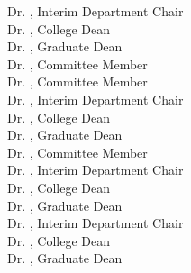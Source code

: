 \begin{titlepage}
Dr. \depchair, Interim Department Chair\\
Dr. \colldean, College Dean\\
Dr. \graddean, Graduate Dean\\
\else
\ifdefined\commemb
Dr. \commema, Committee Member\\
Dr. \commemb, Committee Member\\
Dr. \depchair, Interim Department Chair\\
Dr. \colldean, College Dean\\
Dr. \graddean, Graduate Dean\\
\else
\ifdefined\commema
Dr. \commema, Committee Member\\
Dr. \depchair, Interim Department Chair\\
Dr. \colldean, College Dean\\
Dr. \graddean, Graduate Dean\\
\else
Dr. \depchair, Interim Department Chair\\
Dr. \colldean, College Dean\\
Dr. \graddean, Graduate Dean\\
\fi
\fi
\fi
\fi
\fi
\fi
\fi
\fi
\fi
\end{titlepage}


\restoregeometry